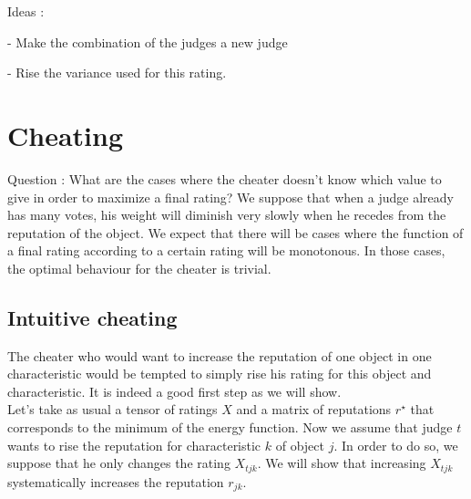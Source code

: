 \documentclass[12pt,a4paper]{article}
\begin{document}
Ideas :

- Make the combination of the judges a new judge

- Rise the variance used for this rating.
\section{Cheating}

Question : What are the cases where the cheater doesn't know which value to give in order to maximize a final rating? We suppose that when a judge already has many votes, his weight will diminish very slowly when he recedes from the reputation of the object. We expect that there will be cases where the function of a final rating according to a certain rating will be monotonous. In those cases, the optimal behaviour for the cheater is trivial.

\subsection{Intuitive cheating}
The cheater who would want to increase the reputation of one object in one characteristic would be tempted to simply rise his rating for this object and characteristic. It is indeed a good first step as we will show.\\

Let's take as usual a tensor of ratings $X$ and a matrix of reputations $r^{\star}$ that corresponds to the minimum of the energy function. Now we assume that judge $t$ wants to rise the reputation for characteristic $k$ of object $j$. In order to do so, we suppose that he only changes the rating $X_{tjk}$. We will show that increasing $X_{tjk}$ systematically increases the reputation $r_{jk}$.
\end{document}
